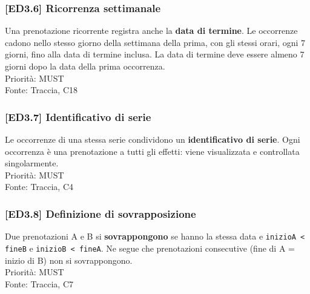 \subsubsection{[ED3.6] Ricorrenza settimanale}
Una prenotazione ricorrente registra anche la \textbf{data di termine}. Le occorrenze cadono nello stesso giorno della settimana della prima, con gli stessi orari, ogni 7 giorni, fino alla data di termine inclusa. La data di termine deve essere almeno 7 giorni dopo la data della prima occorrenza.\\
Priorità: MUST\\Fonte: Traccia, C18

\subsubsection{[ED3.7] Identificativo di serie}
Le occorrenze di una stessa serie condividono un \textbf{identificativo di serie}. Ogni occorrenza è una prenotazione a tutti gli effetti: viene visualizzata e controllata singolarmente.\\
Priorità: MUST\\Fonte: Traccia, C4

\subsubsection{[ED3.8] Definizione di sovrapposizione}
Due prenotazioni A e B si \textbf{sovrappongono} se hanno la stessa data e \texttt{inizioA \textless{} fineB} e \texttt{inizioB \textless{} fineA}. Ne segue che prenotazioni consecutive (fine di A = inizio di B) non si sovrappongono.\\
Priorità: MUST\\Fonte: Traccia, C7
